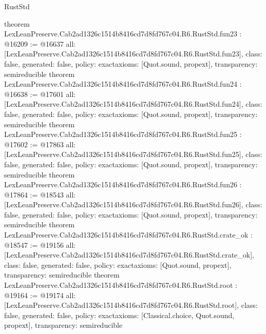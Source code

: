 \begin{lexlean}{RustStd}
\begin{coremodule}
{}
theorem LexLeanPreserve.Cab2ad1326c1514b8416cd7d8fd767c04.R6.RustStd.fun23 : @16209 := @16637 {
  all: [LexLeanPreserve.Cab2ad1326c1514b8416cd7d8fd767c04.R6.RustStd.fun23],
  class: false,
  generated: false,
  policy: exact{axioms: [Quot.sound, propext]},
  transparency: semireducible
}
theorem LexLeanPreserve.Cab2ad1326c1514b8416cd7d8fd767c04.R6.RustStd.fun24 : @16638 := @17601 {
  all: [LexLeanPreserve.Cab2ad1326c1514b8416cd7d8fd767c04.R6.RustStd.fun24],
  class: false,
  generated: false,
  policy: exact{axioms: [Quot.sound, propext]},
  transparency: semireducible
}
theorem LexLeanPreserve.Cab2ad1326c1514b8416cd7d8fd767c04.R6.RustStd.fun25 : @17602 := @17863 {
  all: [LexLeanPreserve.Cab2ad1326c1514b8416cd7d8fd767c04.R6.RustStd.fun25],
  class: false,
  generated: false,
  policy: exact{axioms: [Quot.sound, propext]},
  transparency: semireducible
}
theorem LexLeanPreserve.Cab2ad1326c1514b8416cd7d8fd767c04.R6.RustStd.fun26 : @17864 := @18543 {
  all: [LexLeanPreserve.Cab2ad1326c1514b8416cd7d8fd767c04.R6.RustStd.fun26],
  class: false,
  generated: false,
  policy: exact{axioms: [Quot.sound, propext]},
  transparency: semireducible
}
theorem LexLeanPreserve.Cab2ad1326c1514b8416cd7d8fd767c04.R6.RustStd.crate_ok : @18547 := @19156 {
  all: [LexLeanPreserve.Cab2ad1326c1514b8416cd7d8fd767c04.R6.RustStd.crate_ok],
  class: false,
  generated: false,
  policy: exact{axioms: [Quot.sound, propext]},
  transparency: semireducible
}
theorem LexLeanPreserve.Cab2ad1326c1514b8416cd7d8fd767c04.R6.RustStd.root : @19164 := @19174 {
  all: [LexLeanPreserve.Cab2ad1326c1514b8416cd7d8fd767c04.R6.RustStd.root],
  class: false,
  generated: false,
  policy: exact{axioms: [Classical.choice, Quot.sound, propext]},
  transparency: semireducible
}


\end{coremodule}
\end{lexlean}
